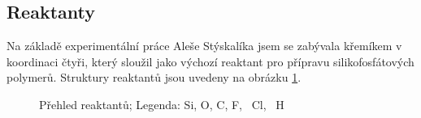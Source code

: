 \documentclass[
digital, %
table,   %
lof,     %
lot,     %
oneside,
]{fithesis3}
\begin{document}
\subsection{Reaktanty}
Na základě experimentální práce Aleše Stýskalíka \cite{Styskalik2015thesis} jsem se zabývala křemíkem v koordinaci čtyři, který sloužil jako výchozí reaktant pro přípravu silikofosfátových polymerů. Struktury reaktantů jsou uvedeny na obrázku \ref{prehled_male_modelyI}.
\begin{figure}
\centering
{}
\caption{Přehled reaktantů; Legenda:  Si,  O,  C,  F, ~Cl, ~H}
\label{prehled_male_modelyI}
\end{figure}
\end{document}
